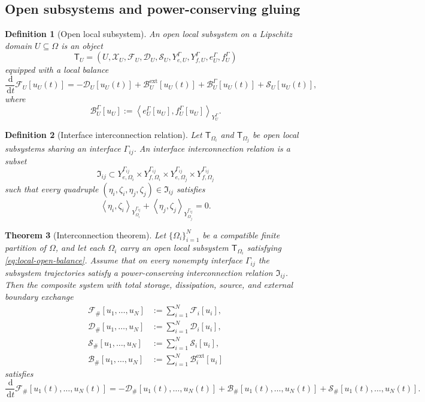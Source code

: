 \documentclass[11pt]{article}
\newtheorem{theorem}{Theorem}[section]
\newtheorem{definition}[theorem]{Definition}
\newcommand{\Om}{\Omega}
\newcommand{\dd}{\,\mathrm{d}}
\newcommand{\F}{\mathcal{F}}
\newcommand{\X}{\mathcal{X}}
\newcommand{\Diss}{\mathcal{D}}
\newcommand{\Bnd}{\mathcal{B}}
\newcommand{\Src}{\mathcal{S}}
\newcommand{\pair}[2]{\left\langle #1,#2\right\rangle}
\begin{document}
\subsection{Open subsystems and power-conserving gluing}

\begin{definition}[Open local subsystem]
An \emph{open local subsystem} on a Lipschitz domain \(U\subseteq \Om\) is an object
\[
\mathsf{T}_U
=
(U,\X_U,\F_U,\Diss_U,\Src_U,
Y_{e,U}^{\Gamma},Y_{f,U}^{\Gamma},e_U^\Gamma,f_U^\Gamma)
\]
equipped with a local balance
\begin{equation}\label{eq:local-open-balance}
\frac{\dd}{\dd t}\F_U[u_U(t)]
=
-\Diss_U[u_U(t)]
+\Bnd_U^{\mathrm{ext}}[u_U(t)]
+\Bnd_U^{\Gamma}[u_U(t)]
+\Src_U[u_U(t)],
\end{equation}
where
\[
\Bnd_U^{\Gamma}[u_U]:=
\pair{e_U^\Gamma[u_U]}{f_U^\Gamma[u_U]}_{Y_U^\Gamma}.
\]
\end{definition}

\begin{definition}[Interface interconnection relation]
Let \(\mathsf{T}_{\Om_i}\) and \(\mathsf{T}_{\Om_j}\) be open local subsystems sharing an
interface \(\Gamma_{ij}\). An \emph{interface interconnection relation} is a subset
\[
\mathfrak{I}_{ij}
\subset
Y_{e,\Om_i}^{\Gamma_{ij}}\times Y_{f,\Om_i}^{\Gamma_{ij}}
\times
Y_{e,\Om_j}^{\Gamma_{ij}}\times Y_{f,\Om_j}^{\Gamma_{ij}}
\]
such that every quadruple
\((\eta_i,\zeta_i,\eta_j,\zeta_j)\in \mathfrak{I}_{ij}\) satisfies
\begin{equation}\label{eq:power-ij}
\pair{\eta_i}{\zeta_i}_{Y_{\Om_i}^{\Gamma_{ij}}}
+
\pair{\eta_j}{\zeta_j}_{Y_{\Om_j}^{\Gamma_{ij}}}
=0.
\end{equation}
\end{definition}

\begin{theorem}[Interconnection theorem]\label{thm:interconnection}
Let \(\{\Om_i\}_{i=1}^N\) be a compatible finite partition of \(\Om\), and let each
\(\Om_i\) carry an open local subsystem \(\mathsf{T}_{\Om_i}\) satisfying
\eqref{eq:local-open-balance}. Assume that on every nonempty interface \(\Gamma_{ij}\)
the subsystem trajectories satisfy a power-conserving interconnection relation
\(\mathfrak{I}_{ij}\). Then the composite system with total storage, dissipation,
source, and external boundary exchange
\begin{align}
\F_\#[u_1,\dots,u_N] &:= \sum_{i=1}^N \F_i[u_i],\label{eq:Fsharp-local}\\
\Diss_\#[u_1,\dots,u_N] &:= \sum_{i=1}^N \Diss_i[u_i],\label{eq:Dsharp-local}\\
\Src_\#[u_1,\dots,u_N] &:= \sum_{i=1}^N \Src_i[u_i],\label{eq:Ssharp-local}\\
\Bnd_\#[u_1,\dots,u_N] &:= \sum_{i=1}^N \Bnd_i^{\mathrm{ext}}[u_i]\label{eq:Bsharp-local}
\end{align}
satisfies
\begin{equation}\label{eq:sharp-local-balance}
\frac{\dd}{\dd t}\F_\#[u_1(t),\dots,u_N(t)]
=
-\Diss_\#[u_1(t),\dots,u_N(t)]
+\Bnd_\#[u_1(t),\dots,u_N(t)]
+\Src_\#[u_1(t),\dots,u_N(t)].
\end{equation}
\end{theorem}
\end{document}
